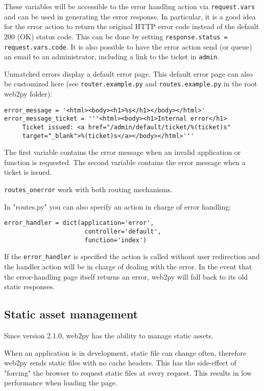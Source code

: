 \documentclass[justified,sixbynine,notoc]{tufte-book}
\def\ft{\small\tt}
\def\inxx#1{\index{#1}}
\begin{document}
\begin{fullwidth}
These variables will be accessible to the error handling action via {\ft request.vars} and can be used in generating the error response. In particular, it is a good idea for the error action to return the original HTTP error code instead of the default 200 (OK) status code. This can be done by setting {\ft response.status = request.vars.code}. It is also possible to have the error action send (or queue) an email to an administrator, including a link to the ticket in {\ft admin}.

Unmatched errors display a default error page. This default error page can also be customized here (see {\ft router.example.py} and {\ft routes.example.py} in the root web2py folder):
\begin{lstlisting}
error_message = '<html><body><h1>%s</h1></body></html>'
error_message_ticket = '''<html><body><h1>Internal error</h1>
     Ticket issued: <a href="/admin/default/ticket/%(ticket)s"
     target="_blank">%(ticket)s</a></body></html>'''
\end{lstlisting}

The first variable contains the error message when an invalid application or function is requested. The second variable contains the error message when a ticket is issued.

{\ft routes\_onerror} work with both routing mechanisms.

\inxx{error\_handler}
In "routes.py" you can also specify an action in charge of error handling:

\begin{lstlisting}
error_handler = dict(application='error',
                      controller='default',
                      function='index')
\end{lstlisting}

If the {\ft error\_handler} is specified the action is called without user redirection and the handler action will be in charge of dealing with the error. In the event that the error-handling page itself returns an error, web2py will fall back to its old static responses.

\goodbreak\subsection{Static asset management}

Since version 2.1.0, web2py has the ability to manage static assets.

When an application is in development, static file can change often, therefore web2py sends static files with no cache headers. This has the side-effect of "forcing" the browser to request static files at every request. This results in low performance when loading the page.


\end{fullwidth}
\end{document}
